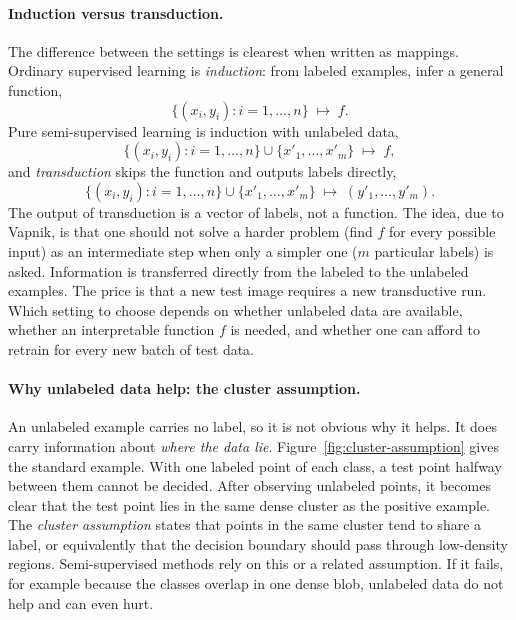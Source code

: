 \paragraph{Induction versus transduction.}
The difference between the settings is clearest when written as mappings.
Ordinary supervised learning is \emph{induction}: from labeled examples, infer
a general function,
\begin{equation}
  \{(x_i,y_i): i=1,\dots,n\} \;\mapsto\; f .
\end{equation}
Pure semi-supervised learning is induction with unlabeled data,
\begin{equation}
  \{(x_i,y_i): i=1,\dots,n\}\cup\{x'_1,\dots,x'_m\} \;\mapsto\; f ,
\end{equation}
and \emph{transduction} skips the function and outputs labels directly,
\begin{equation}
  \{(x_i,y_i): i=1,\dots,n\}\cup\{x'_1,\dots,x'_m\} \;\mapsto\;
  (y'_1,\dots,y'_m).
  \label{eq:transduction}
\end{equation}
The output of transduction is a vector of labels, not a function. The idea,
due to Vapnik, is that one should not solve a harder problem (find $f$ for
every possible input) as an intermediate step when only a simpler one ($m$
particular labels) is asked. Information is transferred directly from the
labeled to the unlabeled examples. The price is that a new test image
requires a new transductive run. Which setting to choose depends on whether
unlabeled data are available, whether an interpretable function $f$ is
needed, and whether one can afford to retrain for every new batch of test
data.

\paragraph{Why unlabeled data help: the cluster assumption.}
An unlabeled example carries no label, so it is not obvious why it helps. It
does carry information about \emph{where the data lie}.
Figure~\ref{fig:cluster-assumption} gives the standard example. With one
labeled point of each class, a test point halfway between them cannot be
decided. After observing unlabeled points, it becomes clear that the test
point lies in the same dense cluster as the positive example. The
\emph{cluster assumption} states that points in the same cluster tend to
share a label, or equivalently that the decision boundary should pass
through low-density regions. Semi-supervised methods rely on this or a
related assumption. If it fails, for example because the classes overlap in
one dense blob, unlabeled data do not help and can even hurt.

